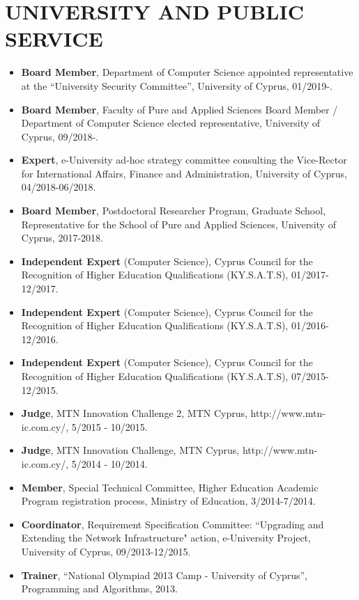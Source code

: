 \documentclass[10pt]{article}
\begin{document}
\section{\bf UNIVERSITY AND PUBLIC SERVICE}
\begin{itemize}
\setlength{\itemsep}{0.10ex}
   \item {\bf Board Member}, Department of Computer Science appointed representative at the ``University Security Committee'', University of Cyprus, 01/2019-.

   \item {\bf Board Member}, Faculty of Pure and Applied Sciences Board Member / Department of Computer Science elected representative, University of Cyprus, 09/2018-.
   \item {\bf Expert}, e-University ad-hoc strategy committee consulting the Vice-Rector for International Affairs, Finance and Administration, University of Cyprus, 04/2018-06/2018.
   \item {\bf Board Member}, Postdoctoral Researcher Program, Graduate School, Representative for the School of Pure and Applied Sciences, University of Cyprus, 2017-2018.
   \item {\bf Independent Expert} (Computer Science), Cyprus Council for the Recognition of Higher Education Qualifications (KY.S.A.T.S), 01/2017-12/2017.
   \item {\bf Independent Expert} (Computer Science), Cyprus Council for the Recognition of Higher Education Qualifications (KY.S.A.T.S), 01/2016-12/2016.
   \item {\bf Independent Expert} (Computer Science), Cyprus Council for the Recognition of Higher Education Qualifications (KY.S.A.T.S), 07/2015-12/2015.
   \item {\bf Judge}, MTN Innovation Challenge 2, MTN Cyprus, http://www.mtn-ic.com.cy/, 5/2015 - 10/2015.
   \item {\bf Judge}, MTN Innovation Challenge, MTN Cyprus, http://www.mtn-ic.com.cy/, 5/2014 - 10/2014.
   \item {\bf Member}, Special Technical Committee, Higher Education Academic Program registration process, Ministry of Education, 3/2014-7/2014.
   \item {\bf Coordinator}, Requirement Specification Committee: ``Upgrading and Extending the Network Infrastructure" action, e-University Project,  University of Cyprus, 09/2013-12/2015.
   \item {\bf Trainer}, ``National Olympiad 2013 Camp - University of Cyprus'', Programming and Algorithms,  2013.

\end{itemize}
\end{document}
